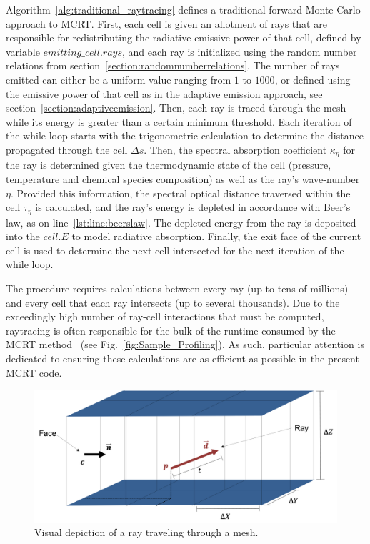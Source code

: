 Algorithm~\ref{alg:traditional_raytracing} defines a traditional forward Monte Carlo approach to MCRT. First, each cell is given an allotment of rays that are responsible for redistributing the radiative emissive power of that cell, defined by variable $emitting\_cell.rays$, and each ray is initialized using the random number relations from section~\ref{section:randomnumberrelations}. The number of rays emitted can either be a uniform value ranging from $1$ to $1000$, or defined using the emissive power of that cell as in the adaptive emission approach, see section~\ref{section:adaptiveemission}. Then, each ray is traced through the mesh while its energy is greater than a certain minimum threshold. Each iteration of the while loop starts with the trigonometric calculation to determine the distance propagated through the cell $\Delta{s}$. Then, the spectral absorption coefficient $\kappa_\eta$ for the ray is determined given the thermodynamic state of the cell (pressure, temperature and chemical species composition) as well as the ray's wave-number $\eta$. Provided this information, the spectral optical distance traversed within the cell $\tau{}_\eta{}$ is calculated, and the ray's energy is depleted in accordance with Beer's law, as on line~\ref{lst:line:beerslaw}. The depleted energy from the ray is deposited into the $cell.E$ to model radiative absorption. Finally, the exit face of the current cell is used to determine the next cell intersected for the next iteration of the while loop.



The procedure requires calculations between every ray (up to tens of millions) and every cell that each ray intersects (up to several thousands). 
Due to the exceedingly high number of ray-cell interactions that must be computed, raytracing is often responsible for the bulk of the runtime consumed by the MCRT method~\cite{Humphrey2012RadiationSystem} (see Fig.~\ref{fig:Sample_Profiling}). As such, particular attention is dedicated to ensuring these calculations are as efficient as possible in the present MCRT code.
\begin{figure}
\centering
\includegraphics[width=0.8\linewidth]{figures/ch3/TracingThroughMesh.png}
\caption{Visual depiction of a ray traveling through a mesh. }
\label{fig:raytracing}
\end{figure}


